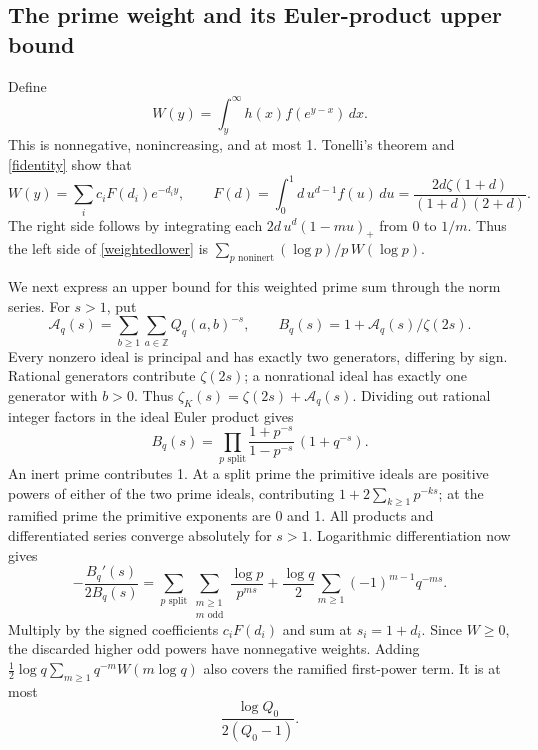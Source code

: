 \documentclass[11pt]{article}
\newcommand{\Z}{\mathbb Z}
\begin{document}
\subsection{The prime weight and its Euler-product upper bound}
Define
\[
 W(y)=\int_y^\infty h(x)f(e^{y-x})\,dx.
\]
This is nonnegative, nonincreasing, and at most 1. Tonelli's theorem
and \eqref{fidentity} show that
\begin{equation}\label{multiplier}
 W(y)=\sum_i c_i F(d_i)e^{-d_i y},\qquad
 F(d)=\int_0^1 d\,u^{d-1}f(u)\,du
       =\frac{2d\zeta(1+d)}{(1+d)(2+d)}.
\end{equation}
The right side follows by integrating each
\(2d\,u^d(1-mu)_+\) from 0 to \(1/m\).
Thus the left side of \eqref{weightedlower} is
\(\sum_{p\text{ noninert}}(\log p)/p\,W(\log p)\).

We next express an upper bound for this weighted prime sum through the
norm series. For \(s>1\), put
\[
 \mathcal A_q(s)=\sum_{b\ge1}\sum_{a\in\Z}Q_q(a,b)^{-s},\qquad
 B_q(s)=1+\mathcal A_q(s)/\zeta(2s).
\]
Every nonzero ideal is principal and has exactly two generators, differing
by sign. Rational generators contribute \(\zeta(2s)\); a nonrational
ideal has exactly one generator with \(b>0\). Thus
\(\zeta_K(s)=\zeta(2s)+\mathcal A_q(s)\). Dividing out rational
integer factors in the ideal Euler product gives
\[
 B_q(s)=\prod_{p\text{ split}}\frac{1+p^{-s}}{1-p^{-s}}\,(1+q^{-s}).
\]
An inert prime contributes 1. At a split prime the primitive ideals
are positive powers of either of the two prime ideals, contributing
\(1+2\sum_{k\ge1}p^{-ks}\); at the ramified prime the primitive
exponents are 0 and 1. All products and differentiated series converge
absolutely for \(s>1\). Logarithmic differentiation now gives
\[
 -\frac{B_q'(s)}{2B_q(s)}
 =\sum_{p\text{ split}}\sum_{\substack{m\ge1\\m\text{ odd}}}
      \frac{\log p}{p^{ms}}
 +\frac{\log q}{2}\sum_{m\ge1}(-1)^{m-1}q^{-ms}.
\]
Multiply by the signed coefficients \(c_iF(d_i)\) and sum at
\(s_i=1+d_i\). Since \(W\ge0\), the discarded higher odd powers
have nonnegative weights. Adding
\(\frac12\log q\sum_{m\ge1}q^{-m}W(m\log q)\) also covers the
ramified first-power term. It is at most
\begin{equation}\label{ramerror}
 \frac{\log Q_0}{2(Q_0-1)}.
\end{equation}
\end{document}
